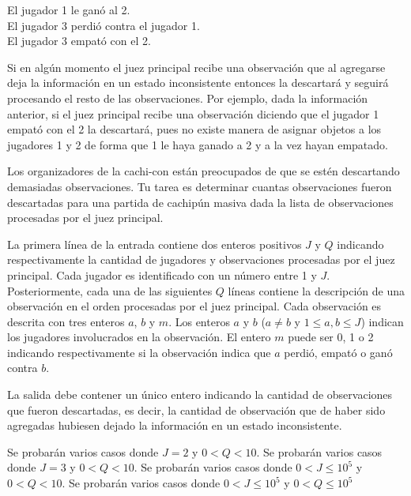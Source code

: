 \documentclass{oci}
\begin{document}
\begin{problemDescription}
    \begin{center}
      El jugador 1 le ganó al 2.\\
      El jugador 3 perdió contra el jugador 1.\\
      El jugador 3 empató con el 2.
    \end{center}

  Si en algún momento el juez principal recibe una observación que al agregarse
  deja la información en un estado inconsistente entonces la descartará y
  seguirá procesando el resto de las observaciones.
  Por ejemplo, dada la información anterior, si el juez principal recibe una
  observación diciendo que el jugador 1 empató con el 2 la descartará, pues
  no existe manera de asignar objetos a los jugadores 1 y 2 de forma que 1 le
  haya ganado a 2 y a la vez hayan empatado.

  Los organizadores de la cachi-con están preocupados de que se estén
  descartando demasiadas observaciones.
  Tu tarea es determinar cuantas observaciones fueron descartadas para una
  partida de cachipún masiva dada la lista de observaciones procesadas por el
  juez principal.
\end{problemDescription}

\begin{inputDescription}
  La primera línea de la entrada contiene dos enteros positivos $J$ y $Q$
  indicando respectivamente la cantidad de jugadores y observaciones procesadas
  por el juez principal.
  Cada jugador es identificado con un número entre 1 y $J$.
  Posteriormente, cada una de las siguientes $Q$ líneas contiene la descripción
  de una observación en el orden procesadas por el juez principal.
  Cada observación es descrita con tres enteros $a$, $b$ y $m$.
  Los enteros $a$ y $b$ ($a\neq b$ y $1\leq a, b \leq J$) indican los jugadores
  involucrados en la observación. 
  El entero $m$ puede ser 0, 1 o 2 indicando respectivamente si la observación indica
  que $a$ perdió, empató o ganó contra $b$.
\end{inputDescription}

\begin{outputDescription}
  La salida debe contener un único entero indicando la cantidad de observaciones
  que fueron descartadas, es decir, la cantidad de observación que de haber sido
  agregadas hubiesen dejado la información en un estado inconsistente.
\end{outputDescription}

\begin{scoreDescription}
   Se probarán varios casos donde $J=2$ y $0 < Q < 10$.
   Se probarán varios casos donde $J=3$ y $0 < Q < 10$.
   Se probarán varios casos donde $0 < J \leq 10^5$ y $0 < Q < 10$.
   Se probarán varios casos donde $0 < J \leq 10^5$ y $0 < Q \leq 10^5$
\end{scoreDescription}

\begin{sampleDescription}
\end{sampleDescription}
\end{document}

